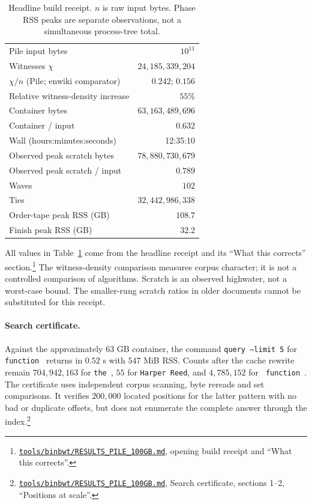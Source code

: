 \documentclass[10pt]{article}
\newcommand{\qnum}[2]{#2}
\newcommand{\ev}[2]{\footnote{\href{https://github.com/pangenome/sxgc/blob/c46a85217b9b269c91179cbebc396f96453181af/#1}{\nolinkurl{#1}}, #2.}}
\begin{document}
\begin{table}[ht]
\centering
\begin{tabular}{lr}
\toprule
Pile input bytes & $\qnum{input}{10^{11}}$ \\
Witnesses $\chi$ & $\qnum{chi}{24{,}185{,}339{,}204}$ \\
$\chi/n$ (Pile; enwiki comparator) & $\qnum{density}{0.242}$; $\qnum{wikidensity}{0.156}$ \\
Relative witness-density increase & $\qnum{densitydelta}{55}\%$ \\
Container bytes & $\qnum{container}{63{,}163{,}489{,}696}$ \\
Container / input & $\qnum{containerratio}{0.632}$ \\
Wall (hours:minutes:seconds) & \qnum{wall}{12:35:10} \\
Observed peak scratch bytes & $\qnum{scratch}{78{,}880{,}730{,}679}$ \\
Observed peak scratch / input & $\qnum{scratchratio}{0.789}$ \\
Waves & $\qnum{waves}{102}$ \\
Ties & $\qnum{ties}{32{,}442{,}986{,}338}$ \\
Order-tape peak RSS (GB) & $\qnum{orderrss}{108.7}$ \\
Finish peak RSS (GB) & $\qnum{finishrss}{32.2}$ \\
\bottomrule
\end{tabular}
\caption{Headline build receipt. $n$ is raw input bytes. Phase RSS peaks are separate observations,
not a simultaneous process-tree total.}
\label{tab:build}
\end{table}
All values in Table~\ref{tab:build} come from the headline receipt and its ``What this corrects''
section.\ev{tools/binbwt/RESULTS_PILE_100GB.md}{opening build receipt and ``What this corrects''}
The witness-density comparison measures corpus character; it is not a controlled comparison of
algorithms. Scratch is an observed highwater, not a worst-case bound. The smaller-rung scratch
ratios in older documents cannot be substituted for this receipt.

\paragraph{Search certificate.}
Against the approximately $\qnum{containershort}{63}$ GB container, the command \texttt{query --limit \qnum{limit}{5}} for \verb| function | returns in $\qnum{querywall}{0.52}$ s with $\qnum{rss}{547}$ MiB RSS. Counts after the cache rewrite remain $\qnum{thecount}{704{,}942{,}163}$ for \verb|the |, $\qnum{harper}{55}$ for \verb|Harper Reed|, and $\qnum{functioncount}{4{,}785{,}152}$ for \verb| function |. The certificate uses independent corpus scanning, byte rereads and set comparisons. It verifies $\qnum{sample}{200{,}000}$ located positions for the latter pattern with no bad or duplicate offsets, but does not enumerate the complete answer through the index.\ev{tools/binbwt/RESULTS_PILE_100GB.md}{Search certificate, sections 1--2, ``Positions at scale''}
\end{document}
